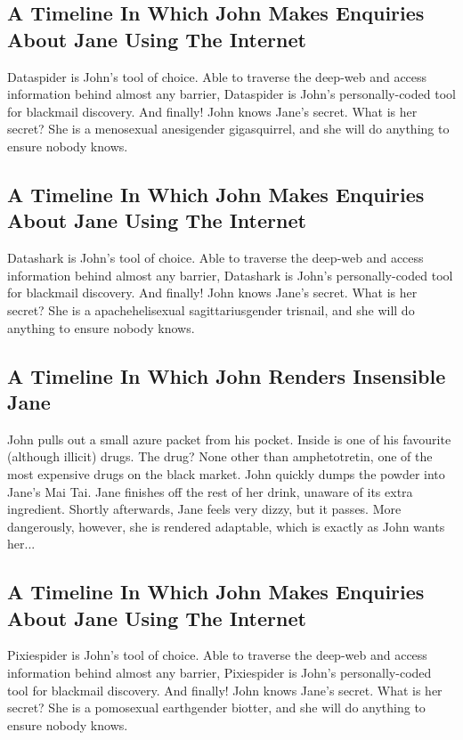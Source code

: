 \documentclass{article}
\begin{document}
\subsection{A Timeline In Which John Makes Enquiries About Jane Using The Internet}


Dataspider is John's tool of choice. Able to traverse the deep{-}web and access information behind almost any barrier, Dataspider is John's personally{-}coded tool for blackmail discovery.
And finally!
John knows Jane's secret. What is her secret? She is a menosexual anesigender gigasquirrel, and she will do anything to ensure nobody knows.
\subsection{A Timeline In Which John Makes Enquiries About Jane Using The Internet}


Datashark is John's tool of choice. Able to traverse the deep{-}web and access information behind almost any barrier, Datashark is John's personally{-}coded tool for blackmail discovery.
And finally!
John knows Jane's secret. What is her secret? She is a apachehelisexual sagittariusgender trisnail, and she will do anything to ensure nobody knows.
\subsection{A Timeline In Which John Renders Insensible Jane}


John pulls out a small azure packet from his pocket. Inside is one of his favourite (although illicit) drugs.
The drug? None other than amphetotretin, one of the most expensive drugs on the black market.
John quickly dumps the powder into Jane's Mai Tai.
Jane finishes off the rest of her drink, unaware of its extra ingredient.
Shortly afterwards, Jane feels very dizzy, but it passes.
More dangerously, however, she is rendered adaptable, which is exactly as John wants her...
\subsection{A Timeline In Which John Makes Enquiries About Jane Using The Internet}


Pixiespider is John's tool of choice. Able to traverse the deep{-}web and access information behind almost any barrier, Pixiespider is John's personally{-}coded tool for blackmail discovery.
And finally!
John knows Jane's secret. What is her secret? She is a pomosexual earthgender biotter, and she will do anything to ensure nobody knows.
\end{document}
